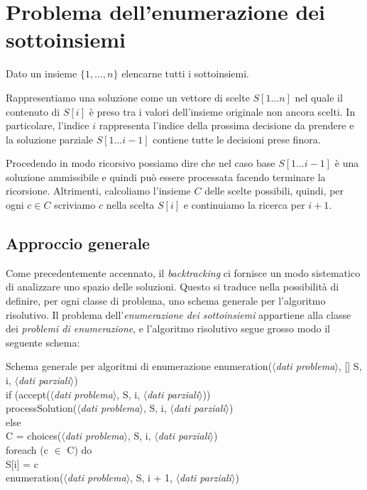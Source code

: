\section{Problema dell'enumerazione dei sottoinsiemi}
\begin{problem}
    Dato un insieme $\{1,\dots,n\}$ elencarne tutti i sottoinsiemi.
\end{problem}

\noindent
Rappresentiamo una soluzione come un vettore di scelte $S[1\dots n]$ nel quale
il contenuto di $S[i]$ è preso tra i valori dell'insieme originale
non ancora scelti. In particolare, l'indice $i$ rappresenta l'indice della
prossima decisione da prendere e la soluzione parziale $S[1\dots i-1]$
contiene tutte le decisioni prese finora.

Procedendo in modo ricorsivo possiamo dire che nel caso base $S[1\dots i-1]$ è
una soluzione ammissibile e quindi può essere processata facendo terminare la
ricorsione. Altrimenti, calcoliamo l'insieme $C$ delle scelte possibili, quindi,
per ogni $c\in C$ scriviamo $c$ nella scelta $S[i]$ e continuiamo la ricerca per
$i+1$.

\subsection{Approccio generale}
Come precedentemente accennato, il \emph{backtracking} ci fornisce un modo
sistematico di analizzare uno spazio delle soluzioni. Questo si traduce nella
possibilità di definire, per ogni classe di problema, uno schema generale per
l'algoritmo risolutivo. Il problema dell'\emph{enumerazione dei sottoinsiemi}
appartiene alla classe dei \emph{problemi di enumerazione}, e l'algoritmo
risolutivo segue grosso modo il seguente schema:

\begin{minicode}{Schema generale per algoritmi di enumerazione}
\ind enumeration($\langle$\emph{dati problema}$\rangle$, [] S,
     i, $\langle$\emph{dati parziali}$\rangle$)\\
    \indf if (accept($\langle$\emph{dati problema}$\rangle$, S, i,
        $\langle$\emph{dati parziali}$\rangle$))\\
        processSolution($\langle$\emph{dati problema}$\rangle$, S, i,
        $\langle$\emph{dati parziali}$\rangle$)\\
    \indf else\\
         C = choices($\langle$\emph{dati problema}$\rangle$, S, i,
        $\langle$\emph{dati parziali}$\rangle$)\\
        \indff foreach (c $\in$ C) do\\
            S[i] = c\\
            enumeration($\langle$\emph{dati problema}$\rangle$, S, i + 1,
            $\langle$\emph{dati parziali}$\rangle$)
\end{minicode}

